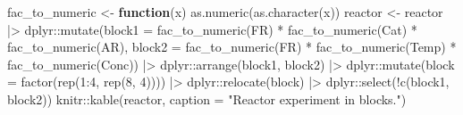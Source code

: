 \documentclass[
]{book}
\newenvironment{Shaded}{\begin{snugshade}}{\end{snugshade}}
\newcommand{\AttributeTok}[1]{\textcolor[rgb]{0.77,0.63,0.00}{#1}}
\newcommand{\ControlFlowTok}[1]{\textcolor[rgb]{0.13,0.29,0.53}{\textbf{#1}}}
\newcommand{\DecValTok}[1]{\textcolor[rgb]{0.00,0.00,0.81}{#1}}
\newcommand{\FunctionTok}[1]{\textcolor[rgb]{0.00,0.00,0.00}{#1}}
\newcommand{\NormalTok}[1]{#1}
\newcommand{\OtherTok}[1]{\textcolor[rgb]{0.56,0.35,0.01}{#1}}
\newcommand{\SpecialCharTok}[1]{\textcolor[rgb]{0.00,0.00,0.00}{#1}}
\newcommand{\StringTok}[1]{\textcolor[rgb]{0.31,0.60,0.02}{#1}}
\theoremstyle{definition}
\theoremstyle{definition}
\theoremstyle{definition}
\theoremstyle{definition}
\theoremstyle{remark}
\begin{document}
\begin{Shaded}
\begin{Highlighting}[]
\NormalTok{fac\_to\_numeric }\OtherTok{\textless{}{-}} \ControlFlowTok{function}\NormalTok{(x) }\FunctionTok{as.numeric}\NormalTok{(}\FunctionTok{as.character}\NormalTok{(x))}
\NormalTok{reactor }\OtherTok{\textless{}{-}}\NormalTok{ reactor }\SpecialCharTok{|\textgreater{}}\NormalTok{ dplyr}\SpecialCharTok{::}\FunctionTok{mutate}\NormalTok{(}\AttributeTok{block1 =} \FunctionTok{fac\_to\_numeric}\NormalTok{(FR) }\SpecialCharTok{*} \FunctionTok{fac\_to\_numeric}\NormalTok{(Cat) }\SpecialCharTok{*}
                           \FunctionTok{fac\_to\_numeric}\NormalTok{(AR), }
                         \AttributeTok{block2 =} \FunctionTok{fac\_to\_numeric}\NormalTok{(FR) }\SpecialCharTok{*} \FunctionTok{fac\_to\_numeric}\NormalTok{(Temp) }\SpecialCharTok{*} 
                           \FunctionTok{fac\_to\_numeric}\NormalTok{(Conc)) }\SpecialCharTok{|\textgreater{}} 
\NormalTok{  dplyr}\SpecialCharTok{::}\FunctionTok{arrange}\NormalTok{(block1, block2) }\SpecialCharTok{|\textgreater{}}
\NormalTok{  dplyr}\SpecialCharTok{::}\FunctionTok{mutate}\NormalTok{(}\AttributeTok{block =} \FunctionTok{factor}\NormalTok{(}\FunctionTok{rep}\NormalTok{(}\DecValTok{1}\SpecialCharTok{:}\DecValTok{4}\NormalTok{, }\FunctionTok{rep}\NormalTok{(}\DecValTok{8}\NormalTok{, }\DecValTok{4}\NormalTok{)))) }\SpecialCharTok{|\textgreater{}}
\NormalTok{  dplyr}\SpecialCharTok{::}\FunctionTok{relocate}\NormalTok{(block) }\SpecialCharTok{|\textgreater{}} 
\NormalTok{  dplyr}\SpecialCharTok{::}\FunctionTok{select}\NormalTok{(}\SpecialCharTok{!}\FunctionTok{c}\NormalTok{(block1, block2))}
\NormalTok{knitr}\SpecialCharTok{::}\FunctionTok{kable}\NormalTok{(reactor, }\AttributeTok{caption =} \StringTok{"Reactor experiment in blocks."}\NormalTok{)}
\end{Highlighting}
\end{Shaded}
\end{document}
